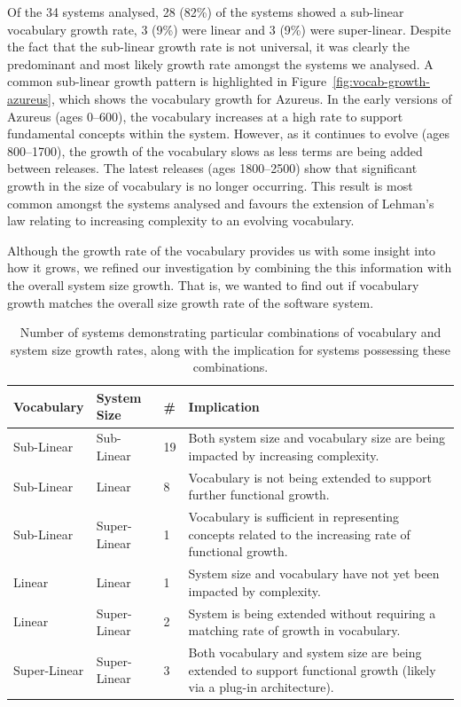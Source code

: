 Of the 34 systems analysed, 28 (82\%) of the systems showed a sub-linear vocabulary growth rate, 3 (9\%) were linear and 3 (9\%) were super-linear. Despite the fact that the sub-linear growth rate is not universal, it was clearly the predominant and most likely growth rate amongst the systems we analysed. A common sub-linear growth pattern is highlighted in Figure~\ref{fig:vocab-growth-azureus}, which shows the vocabulary growth for Azureus. In the early versions of Azureus (ages 0--600), the vocabulary increases at a high rate to support fundamental concepts within the system. However, as it continues to evolve (ages 800--1700), the growth of the vocabulary slows as less terms are being added between releases. The latest releases (ages 1800--2500) show that significant growth in the size of vocabulary is no longer occurring. This result is most common amongst the systems analysed and favours the extension of Lehman's law relating to increasing complexity to an evolving vocabulary.

Although the growth rate of the vocabulary provides us with some insight into how it grows,
we refined our investigation by combining the this information with the overall system size growth. That is, we wanted to find out if vocabulary growth matches the overall size growth rate of the software system.

\begin{table}[t]
\centering
\begin{tabular}{|p{}|p{}|p{}|p{}|}
\hline
{\bf Vocabulary} & {\bf System Size} & {\bf \#} & {\bf Implication} \\
\hline
\hline
Sub-Linear
&
Sub-Linear
&
19
&
Both system size and vocabulary size are being impacted by increasing complexity.
\\
\hline
Sub-Linear
&
Linear
&
8
&
Vocabulary is not being extended to support further functional growth.
\\
\hline
Sub-Linear
&
Super-Linear
&
1
&
Vocabulary is sufficient in representing concepts related to the increasing rate of functional growth.
\\
\hline
Linear
&
Linear
&
1
&
System size and vocabulary have not yet been impacted by complexity.
\\
\hline
Linear
&
Super-Linear
&
2
&
System is being extended without requiring a matching rate of growth in vocabulary.
\\
\hline
Super-Linear
&
Super-Linear
&
3
&
Both vocabulary and system size are being extended to support functional growth (likely via a plug-in architecture).
\\
\hline
\end{tabular}
\vspace{0.2cm}
\caption{Number of systems demonstrating particular combinations of vocabulary and system size growth rates, along with the implication for systems possessing these combinations.}
\label{tab:growth_rate_results}
\vspace{-0.2cm}
\end{table}

